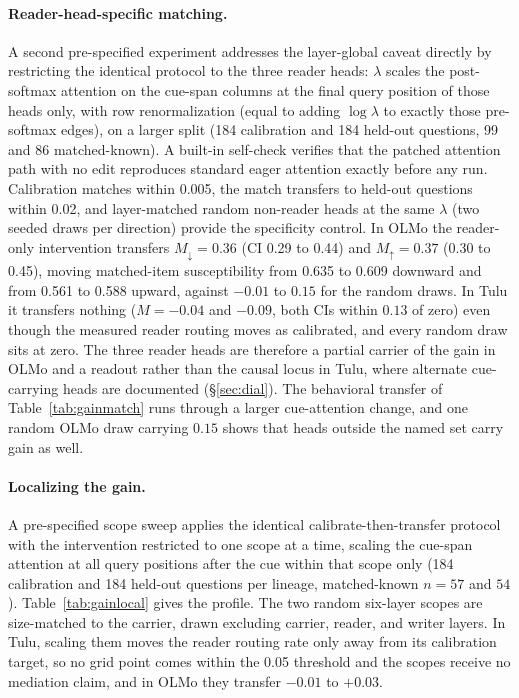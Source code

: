 \documentclass{article}
\begin{document}
\paragraph{Reader-head-specific matching.} A second pre-specified experiment addresses the layer-global caveat directly by restricting the identical protocol to the three reader heads: $\lambda$ scales the post-softmax attention on the cue-span columns at the final query position of those heads only, with row renormalization (equal to adding $\log\lambda$ to exactly those pre-softmax edges), on a larger split (184 calibration and 184 held-out questions, 99 and 86 matched-known). A built-in self-check verifies that the patched attention path with no edit reproduces standard eager attention exactly before any run. Calibration matches within 0.005, the match transfers to held-out questions within 0.02, and layer-matched random non-reader heads at the same $\lambda$ (two seeded draws per direction) provide the specificity control. In OLMo the reader-only intervention transfers $M_\downarrow = 0.36$ (CI 0.29 to 0.44) and $M_\uparrow = 0.37$ (0.30 to 0.45), moving matched-item susceptibility from 0.635 to 0.609 downward and from 0.561 to 0.588 upward, against $-0.01$ to $0.15$ for the random draws. In Tulu it transfers nothing ($M = -0.04$ and $-0.09$, both CIs within $0.13$ of zero) even though the measured reader routing moves as calibrated, and every random draw sits at zero. The three reader heads are therefore a partial carrier of the gain in OLMo and a readout rather than the causal locus in Tulu, where alternate cue-carrying heads are documented (\S\ref{sec:dial}). The behavioral transfer of Table~\ref{tab:gainmatch} runs through a larger cue-attention change, and one random OLMo draw carrying $0.15$ shows that heads outside the named set carry gain as well.

\paragraph{Localizing the gain.} A pre-specified scope sweep applies the identical calibrate-then-transfer protocol with the intervention restricted to one scope at a time, scaling the cue-span attention at all query positions after the cue within that scope only (184 calibration and 184 held-out questions per lineage, matched-known $n=57$ and $54$). Table~\ref{tab:gainlocal} gives the profile. The two random six-layer scopes are size-matched to the carrier, drawn excluding carrier, reader, and writer layers. In Tulu, scaling them moves the reader routing rate only away from its calibration target, so no grid point comes within the 0.05 threshold and the scopes receive no mediation claim, and in OLMo they transfer $-0.01$ to $+0.03$.
\end{document}
